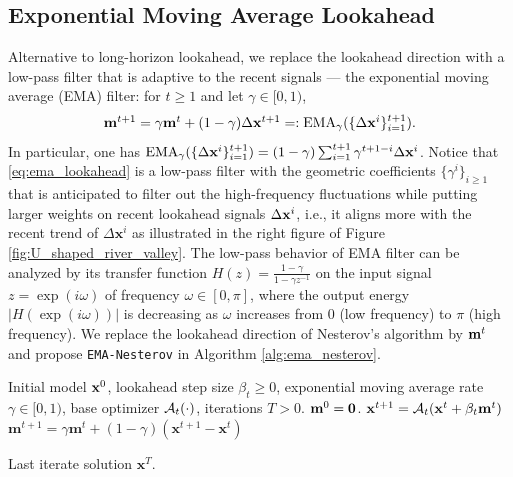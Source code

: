 \documentclass{article}
\theoremstyle{plain}
\theoremstyle{definition}
\theoremstyle{remark}
\def\algname{{\tt EMA-Nesterov}}
\def\bx{\mathbf{x}}
\def\bm{\mathbf{m}}
\begin{document}
\vspace{-0.5\baselineskip}
\subsection{Exponential Moving Average Lookahead}
\vspace{-0.5\baselineskip}




Alternative to long-horizon lookahead, we replace the lookahead direction with a low-pass filter that is adaptive to the recent signals --- the exponential moving average (EMA) filter: for $t \geq 1$ and let $\gamma \in [0,1)$,
\begin{equation} \label{eq:ema_lookahead}
\textstyle \bm^{t+1} = \gamma \bm^t + (1-\gamma) \Delta \bx^{t+1} =: {\rm EMA}_\gamma ( \{ \Delta \bx^i \}_{i=1}^{t+1} ).
\end{equation}
In particular, one has ${\rm EMA}_\gamma ( \{ \Delta \bx^i \}_{i=1}^{t+1} ) = (1-\gamma) \sum_{i=1}^{t+1} \gamma^{t+1-i} \Delta \bx^i$.
Notice that \eqref{eq:ema_lookahead} is a low-pass filter with the geometric coefficients $\{ \gamma^{i} \}_{i \geq 1}$ that is anticipated to filter out the high-frequency fluctuations while putting larger weights on recent lookahead signals $\Delta {\bf x}^i$, i.e., it aligns more with the recent trend of $\Delta \bx^i$ as illustrated in the right figure of Figure \ref{fig:U_shaped_river_valley}. The low-pass behavior of EMA filter can be analyzed by its transfer function $H(z) = \frac{1-\gamma}{1-\gamma z^{-1}}$ on the input signal $z=\exp(i\omega)$ of frequency $\omega \in [0, \pi]$, where the output energy $|H(\exp(i\omega))|$ is decreasing as $\omega$ increases from $0$ (low frequency) to $\pi$ (high frequency). 
We replace the lookahead direction of Nesterov's algorithm by ${\bf m}^t$ and propose {\algname} in Algorithm \ref{alg:ema_nesterov}.

\begin{algorithm}
\caption{{\tt EMA-Nesterov} Algorithm}
\label{alg:ema_nesterov}
\begin{algorithmic}[1]
 Initial model ${\bf x}^0$, lookahead step size $\beta_t \ge 0$, exponential moving average rate $\gamma \in [0, 1)$, base optimizer ${\cal A}_t(\cdot )$, iterations $T > 0$.
 $\bm^0 = {\bf 0}$.
\STATE \label{alg_step:lookahead_opt} $\bx^{t+1} = {\cal A}_t(\bx^t + \beta_t \bm^t)$
\STATE \label{alg_step:ema_lookahead} $\bm^{t+1} =  \gamma \bm^t + (1-\gamma) (\bx^{t+1} -  \bx^t) $

\ENDFOR
{} Last iterate solution $\bx^T$.
\end{algorithmic}
\end{algorithm}
\end{document}
